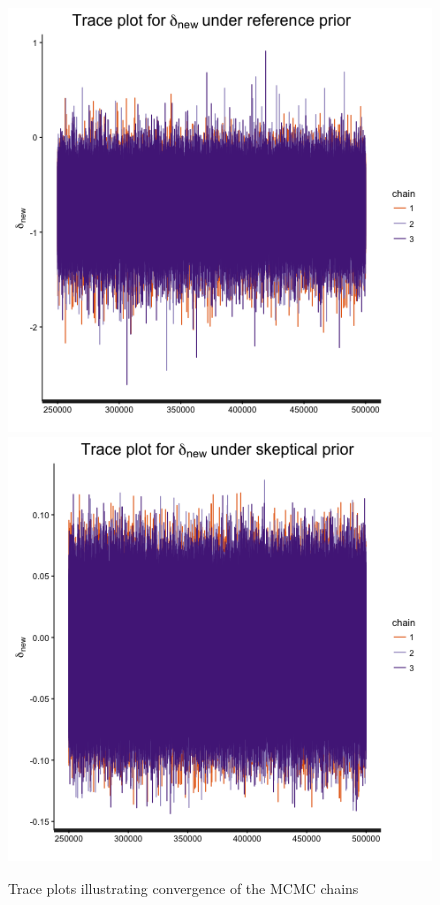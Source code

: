 \documentclass[fleqn,10pt]{SelfArx} %
\begin{document}
\begin{center}
\begin{figure}
\includegraphics[scale=0.55]{./../figures/reference_trace.png}\\
\includegraphics[scale=0.55]{./../figures/skeptical_trace.png}
\caption{Trace plots illustrating convergence of the MCMC chains}
\label{fig:post_trace}
\end{figure}
\end{center}
\end{document}
